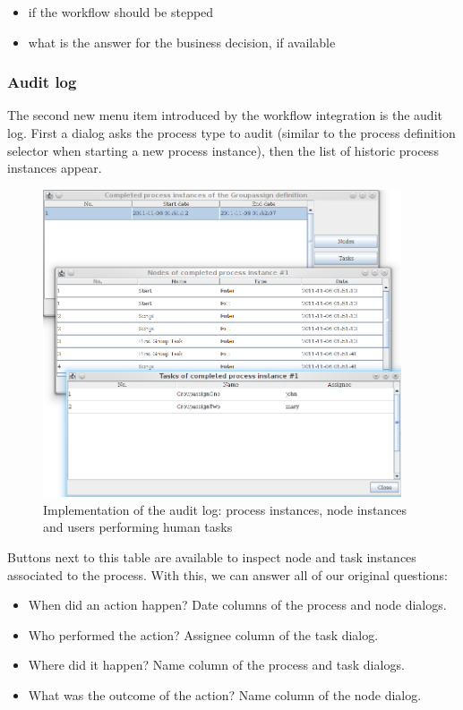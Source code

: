 \begin{itemize}
\item if the workflow should be stepped
\item what is the answer for the business decision, if available
\end{itemize}

\subsubsection*{Audit log}

The second new menu item introduced by the workflow integration is the audit
log. First a dialog asks the process type to audit (similar to the process
definition selector when starting a new process instance), then the list of
historic process instances appear.

\begin{figure}[H]
\centering
\includegraphics[width=400px,keepaspectratio]{implementation-auditlog.png}
\caption{Implementation of the audit log: process instances, node instances and users performing human tasks}
\label{fig:implementation-auditlog}
\end{figure}

Buttons next to this table are available to inspect node and task instances
associated to the process. With this, we can answer all of our original
questions:

\begin{itemize}
\item When did an action happen? Date columns of the process and node dialogs.
\item Who performed the action? Assignee column of the task dialog.
\item Where did it happen? Name column of the process and task dialogs.
\item What was the outcome of the action? Name column of the node dialog.
\end{itemize}

